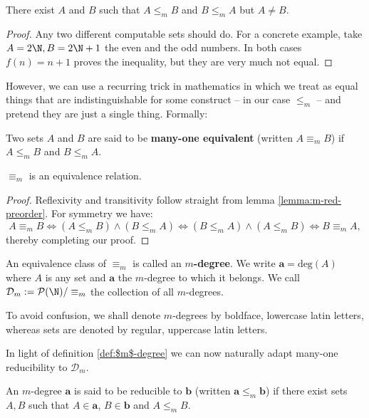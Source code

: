 \documentclass[../main.tex]{memoir}
\begin{document}
\begin{lemma}
  There exist $A$ and $B$ such that $A \le_m B$ and $B \le_m A$ but $A \neq B$.
\end{lemma}
\begin{proof}
  Any two different computable sets should do. For a concrete example, take $A = 2\N, B = 2\N + 1$ the even and the odd numbers. In both cases $f(n) = n + 1$ proves the inequality, but they are very much not equal.
\end{proof}

However, we can use a recurring trick in mathematics in which we treat as equal things that are indistinguishable for some construct -- in our case $\le_m$ -- and pretend they are just a single thing. Formally:

\begin{definition}
  Two sets $A$ and $B$ are said to be \textbf{many-one equivalent} (written $A \equiv_m B$) if $A \le_m B$ and $B \le_m A$.
\end{definition}

\begin{lemma}
  $\equiv_m$ is an equivalence relation.
\end{lemma}
\begin{proof}
  Reflexivity and transitivity follow straight from lemma \ref{lemma:m-red-preorder}. For symmetry we have:
  \[ A \equiv_m B \iff (A \le_m B) \land (B \le_m A) \iff (B \le_m A) \land (A \le_m B)  \iff B \equiv_m A, \]
  thereby completing our proof.
\end{proof}

\begin{definition}
  \label{def:$m$-degree}
  An equivalence class of $\equiv_m$ is called an \textbf{$m$-degree}. We write $\mathbf{a} = \text{deg}(A)$ where $A$ is any set and $\mathbf{a}$ the $m$-degree to which it belongs. We call $\mathbf{\mathcal{D}}_m := \mathcal{P}(\N) / \equiv_m$ the collection of all $m$-degrees.
\end{definition}

\begin{remark}
  To avoid confusion, we shall denote $m$-degrees by boldface, lowercase latin letters, whereas sets are denoted by regular, uppercase latin letters.
\end{remark}

In light of definition \ref{def:$m$-degree} we can now naturally adapt many-one reducibility to $\mathbf{\mathcal{D}}_m$.

\begin{definition}
  An $m$-degree $\mathbf{a}$ is said to be reducible to $\mathbf{b}$ (written $\mathbf{a} \le_m \mathbf{b}$) if there exist sets $A, B$ such that $A \in \mathbf{a}$, $B \in \mathbf{b}$ and $A \le_m B$.
\end{definition}
\end{document}
